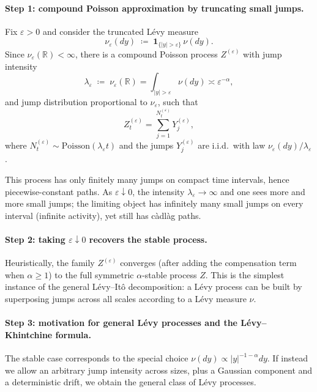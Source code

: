 \documentclass[11pt]{article}
\begin{document}
\paragraph{Step 1: compound Poisson approximation by truncating small jumps.}
Fix $\varepsilon>0$ and consider the truncated L\'evy measure
\begin{equation}\label{eq:truncated_levy_measure}
\nu_\varepsilon(dy)\;\coloneqq\;\mathbf 1_{\{|y|>\varepsilon\}}\,\nu(dy).
\end{equation}
Since $\nu_\varepsilon(\mathbb R)<\infty$, there is a compound Poisson process $Z^{(\varepsilon)}$ with jump intensity
\begin{equation}\label{eq:lambda_eps}
\lambda_\varepsilon \;\coloneqq\;\nu_\varepsilon(\mathbb R)
=
\int_{|y|>\varepsilon}\nu(dy)
\asymp \varepsilon^{-\alpha},
\end{equation}
and jump distribution proportional to $\nu_\varepsilon$, such that
\begin{equation}\label{eq:compound_poisson_form}
Z^{(\varepsilon)}_t = \sum_{j=1}^{N_t^{(\varepsilon)}} Y_j^{(\varepsilon)},
\end{equation}
where $N_t^{(\varepsilon)}\sim \mathrm{Poisson}(\lambda_\varepsilon t)$ and the jumps $Y_j^{(\varepsilon)}$ are i.i.d.\ with law $\nu_\varepsilon(dy)/\lambda_\varepsilon$.

This process has only finitely many jumps on compact time intervals, hence piecewise-constant paths. As $\varepsilon\downarrow 0$, the intensity $\lambda_\varepsilon\to\infty$ and one sees more and more small jumps; the limiting object has infinitely many small jumps on every interval (infinite activity), yet still has c\`adl\`ag paths.

\paragraph{Step 2: taking $\varepsilon\downarrow 0$ recovers the stable process.}
Heuristically, the family $Z^{(\varepsilon)}$ converges (after adding the compensation term when $\alpha\ge 1$) to the full symmetric $\alpha$-stable process $Z$. This is the simplest instance of the general L\'evy--It\^o decomposition: a L\'evy process can be built by superposing jumps across all scales according to a L\'evy measure $\nu$.

\paragraph{Step 3: motivation for general L\'evy processes and the L\'evy--Khintchine formula.}
The stable case corresponds to the special choice $\nu(dy)\propto |y|^{-1-\alpha}dy$. If instead we allow an arbitrary jump intensity across sizes, plus a Gaussian component and a deterministic drift, we obtain the general class of L\'evy processes.
\end{document}
